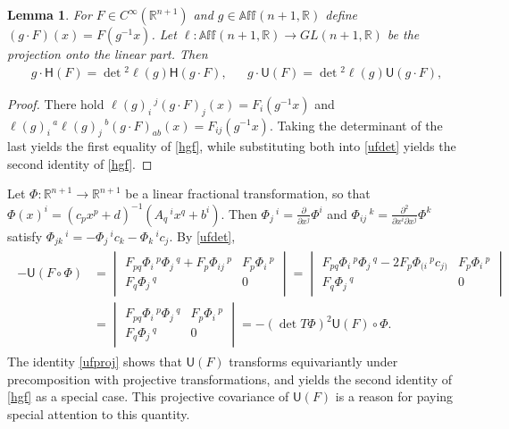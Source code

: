 \documentclass [leqno, 10pt]{amsart}
\newtheorem{lemma}[theorem]{Lemma}
\theoremstyle{definition}
\numberwithin{equation}{section}
\newcommand{\U}{\mathsf{U}}
\renewcommand{\H}{\mathsf{H}}
\newcommand{\cinf}{C^{\infty}}
\newcommand{\pr}{\partial}
\newcommand{\Aff}{\mathbb{Aff}}
\newcommand{\rea}{\mathbb R}
\begin{document}
\begin{lemma}\label{hgflemma}
For $F \in \cinf(\rea^{n+1})$ and $g \in \Aff(n+1, \rea)$ define $(g \cdot F)(x) = F(g^{-1}x)$. Let $\ell:\Aff(n+1, \rea) \to GL(n+1, \rea)$ be the projection onto the linear part. Then
\begin{align}\label{hgf}
&g\cdot \H(F) = \det{}^{2}\ell(g) \H(g\cdot F),& &g\cdot \U(F) = \det{}^{2} \ell(g) \U(g\cdot F),
\end{align}
\end{lemma}
\begin{proof}
There hold $\ell(g)_{i}\,^{j}(g\cdot F)_{j}(x) = F_{i}(g^{-1}x)$ and $\ell(g)_{i}\,^{a}\ell(g)_{j}\,^{b}(g \cdot F)_{ab}(x) = F_{ij}(g^{-1}x)$. Taking the determinant of the last yields the first equality of \eqref{hgf}, while substituting both into \eqref{ufdet} yields the second identity of \eqref{hgf}.
\end{proof}
\begin{remark}
Let $\Phi:\rea^{n+1} \to \rea^{n+1}$ be a linear fractional transformation, so that $\Phi(x)^{i} = (c_{p}x^{p} + d)^{-1}(A_{q}\,^{i}x^{q} + b^{i})$. Then $\Phi_{j}\,^{i} = \tfrac{\pr}{\pr x^{j}}\Phi^{i}$ and $\Phi_{ij}\,^{k} = \tfrac{\pr^{2}}{\pr x^{i}\pr x^{j}}\Phi^{k}$ satisfy $\Phi_{jk}\,^{i} = -\Phi_{j}\,^{i}c_{k} - \Phi_{k}\,^{i}c_{j}$. By \eqref{ufdet},
\begin{align}\label{ufproj}
\begin{split}
-\U(F\circ \Phi) & = \begin{vmatrix} F_{pq}\Phi_{i}\,^{p}\Phi_{j}\,^{q} + F_{p}\Phi_{ij}\,^{p} & F_{p}\Phi_{i}\,^{p} \\ F_{q}\Phi_{j}\,^{q} & 0 \end{vmatrix} =   \begin{vmatrix} F_{pq}\Phi_{i}\,^{p}\Phi_{j}\,^{q} - 2F_{p}\Phi_{(i}\,^{p}c_{j)} & F_{p}\Phi_{i}\,^{p} \\ F_{q}\Phi_{j}\,^{q} & 0 \end{vmatrix}\\& = \begin{vmatrix} F_{pq}\Phi_{i}\,^{p}\Phi_{j}\,^{q}  & F_{p}\Phi_{i}\,^{p} \\ F_{q}\Phi_{j}\,^{q} & 0 \end{vmatrix} = -(\det T\Phi)^{2}\U(F)\circ \Phi.
\end{split}
\end{align}
The identity \eqref{ufproj} shows that $\U(F)$ transforms equivariantly under precomposition with projective transformations, and yields the second identity of \eqref{hgf} as a special case. This projective covariance of $\U(F)$ is a reason for paying special attention to this quantity.
\end{remark}
\end{document}
